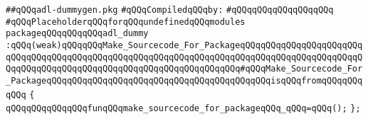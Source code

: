 \label{src/lib/compiler/back/low/tools/arch/adl-dummygen.pkg}
\verb|##qQQqadl-dummygen.pkg|\newline
\newline
\verb|#qQQqCompiledqQQqby:|\newline
\verb|#qQQqqQQqqQQqqQQqqQQq|\newline
\newline
\verb|#qQQqPlaceholderqQQqforqQQqundefinedqQQqmodules|\newline
\newline
\verb|packageqQQqqQQqqQQqadl_dummy|\newline
\verb|:qQQq(weak)qQQqqQQqMake_Sourcecode_For_PackageqQQqqQQqqQQqqQQqqQQqqQQqqQQqqQQqqQQqqQQqqQQqqQQqqQQqqQQqqQQqqQQqqQQqqQQqqQQqqQQqqQQqqQQqqQQqqQQqqQQqqQQqqQQqqQQqqQQqqQQqqQQqqQQqqQQqqQQqqQQq#qQQqMake_Sourcecode_For_PackageqQQqqQQqqQQqqQQqqQQqqQQqqQQqqQQqqQQqqQQqqQQqisqQQqfromqQQqqQQqqQQq|\newline
\verb|{|\newline
\verb|qQQqqQQqqQQqqQQqfunqQQqmake_sourcecode_for_packageqQQq_qQQq=qQQq();|\newline
\verb|};|\newline


